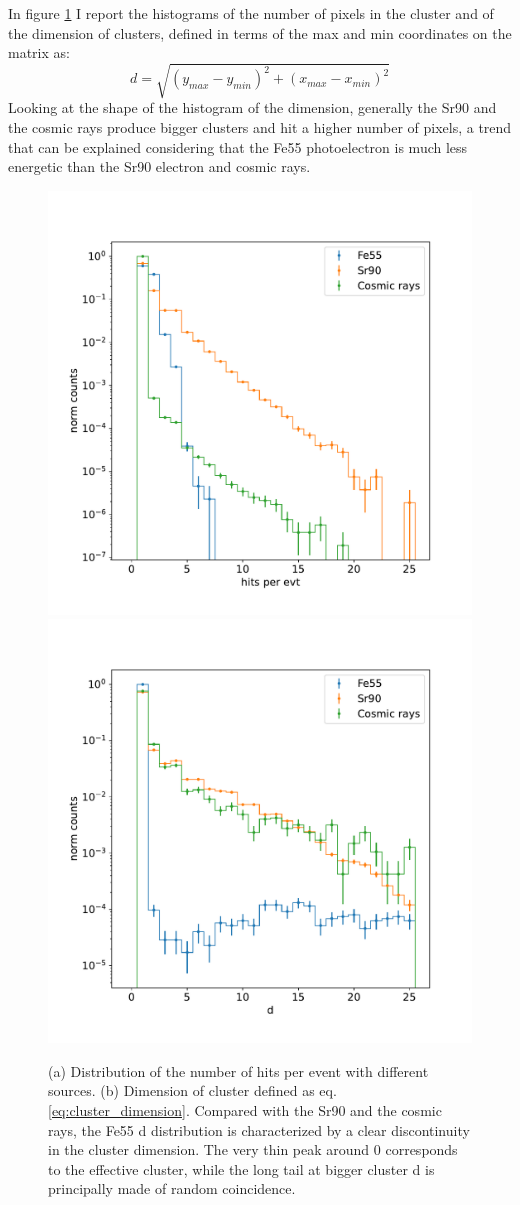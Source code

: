         In figure \ref{fig:cluster_dimension} I report the histograms of the number of pixels in the cluster and of the dimension of clusters, defined in terms of the max and min coordinates on the matrix as:
        \begin{equation}
            d = \sqrt{(y_{max}-y_{min})^2 + (x_{max}-x_{min})^2}
        \end{equation}\label{eq:cluster_dimension}
        Looking at the shape of the histogram of the dimension, generally the Sr90 and the cosmic rays produce bigger clusters and hit a higher number of pixels, a trend that can be explained considering that the Fe55 photoelectron is much less energetic than the Sr90 electron and cosmic rays. 
        \begin{figure}[h!]
            \centering
            \includegraphics[width=.49\linewidth]{figures/charaterization/hits_per_evt.pdf}
            \includegraphics[width=.49\linewidth]{figures/charaterization/cluster_dimension.pdf}
            \caption{(a) Distribution of the number of hits per event with different sources. (b) Dimension of cluster defined as eq.\ref{eq:cluster_dimension}. Compared with the Sr90 and the cosmic rays, the Fe55 d distribution is characterized by a clear discontinuity in the cluster dimension. The very thin peak around 0 corresponds to the effective cluster, while the long tail at bigger cluster d is principally made of random coincidence.}
            \label{fig:cluster_dimension}
        \end{figure} 
